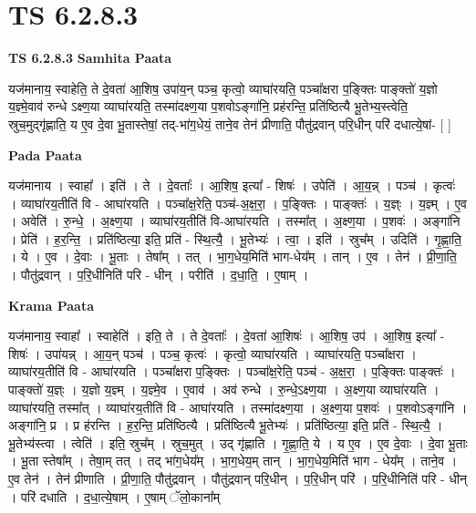 \documentclass[17pt]{extarticle}
\begin{document}
\section{ TS 6.2.8.3 }

\textbf{TS 6.2.8.3 } \newline
\textbf{Samhita Paata} \newline

यज॑मानाय॒ स्वाहेति॒ ते दे॒वता॑ आ॒शिष॒ उपा॑य॒न् पञ्च॒ कृत्वो॒ व्याघा॑रयति॒ पञ्चा᳚क्षरा प॒ङ्क्तिः पाङ्क्तो॑ य॒ज्ञो य॒ज्ञ्मे॒वाव॑ रुन्धे ऽक्ष्ण॒या व्याघा॑रयति॒ तस्मा॑दक्ष्ण॒या प॒शवोऽङ्गा॑नि॒ प्रह॑रन्ति॒ प्रति॑ष्ठित्यै भू॒तेभ्य॒स्त्वेति॒ स्रुच॒मुद्गृ॑ह्णाति॒ य ए॒व दे॒वा भू॒तास्तेषां॒ तद्-भा॑ग॒धेयं॒ ताने॒व तेन॑ प्रीणाति॒ पौतु॑द्रवान् परि॒धीन् परि॑ दधात्ये॒षां- [  ] \newline

\textbf{Pada Paata} \newline

यज॑मानाय । स्वाहा᳚ । इति॑ । ते । दे॒वताः᳚ । आ॒शिष॒ इत्या᳚ - शिषः॑ । उपेति॑ । आ॒य॒न्न् । पञ्च॑ । कृत्वः॑ । व्याघा॑रय॒तीति॑ वि - आघा॑रयति । पञ्चा᳚क्ष॒रेति॒ पञ्च॑-अ॒क्ष॒रा॒ । प॒ङ्क्तिः । पाङ्क्तः॑ । य॒ज्ञ्ः । य॒ज्ञ्म् । ए॒व । अवेति॑ । रु॒न्धे॒ । अ॒क्ष्ण॒या । व्याघा॑रय॒तीति॑ वि-आघा॑रयति । तस्मा᳚त् । अ॒क्ष्ण॒या । प॒शवः॑ । अङ्गा॑नि । प्रेति॑ । ह॒र॒न्ति॒ । प्रति॑ष्ठित्या॒ इति॒ प्रति॑ - स्थि॒त्यै॒ । भू॒तेभ्यः॑ । त्वा॒ । इति॑ । स्रुच᳚म् । उदिति॑ । गृ॒ह्णा॒ति॒ । ये । ए॒व । दे॒वाः । भू॒ताः । तेषा᳚म् । तत् । भा॒ग॒धेय॒मिति॑ भाग-धेय᳚म् । तान् । ए॒व । तेन॑ । प्री॒णा॒ति॒ । पौतु॑द्रवान् । प॒रि॒धीनिति॑ परि - धीन् । परीति॑ । द॒धा॒ति॒ । ए॒षाम् ।  \newline


\textbf{Krama Paata} \newline

यज॑मानाय॒ स्वाहा᳚ । स्वाहेति॑ । इति॒ ते । ते दे॒वताः᳚ । दे॒वता॑ आ॒शिषः॑ । आ॒शिष॒ उप॑ । आ॒शिष॒ इत्या᳚ - शिषः॑ । उपा॑यन्न् । आ॒य॒न् पञ्च॑ । पञ्च॒ कृत्वः॑ । कृत्वो॒ व्याघा॑रयति । व्याघा॑रयति॒ पञ्चा᳚क्षरा । व्याघा॑रय॒तीति॑ वि - आघा॑रयति । पञ्चा᳚क्षरा प॒ङ्‍क्तिः । पञ्चा᳚क्ष॒रेति॒ पञ्च॑ - अ॒क्ष॒रा॒ । प॒ङ्‍क्तिः पाङ्‍क्तः॑ । पाङ्‍क्तो॑ य॒ज्ञ्ः । य॒ज्ञो य॒ज्ञ्म् । य॒ज्ञ्मे॒व । ए॒वाव॑ । अव॑ रुन्धे । रु॒न्धे॒ऽक्ष्ण॒या । अ॒क्ष्ण॒या व्याघा॑रयति । व्याघा॑रयति॒ तस्मा᳚त् । व्याघा॑रय॒तीति॑ वि - आघा॑रयति । तस्मा॑दक्ष्ण॒या । अ॒क्ष्ण॒या प॒शवः॑ । प॒शवोऽङ्‍गा॑नि । अङ्‍गा॑नि॒ प्र । प्र ह॑रन्ति । ह॒र॒न्ति॒ प्रति॑ष्ठित्यै । प्रति॑ष्ठित्यै भू॒तेभ्यः॑ । प्रति॑ष्ठित्या॒ इति॒ प्रति॑ - स्थि॒त्यै॒ । भू॒तेभ्य॑स्त्वा । त्वेति॑ । इति॒ स्रुच᳚म् । स्रुच॒मुत् । उद् गृ॑ह्णाति । गृ॒ह्णा॒ति॒ ये । य ए॒व । ए॒व दे॒वाः । दे॒वा भू॒ताः । भू॒ता स्तेषा᳚म् । तेषा॒म् तत् । तद् भा॑ग॒धेय᳚म् । भा॒ग॒धेय॒म् तान् । भा॒ग॒धेय॒मिति॑ भाग - धेय᳚म् । ताने॒व । ए॒व तेन॑ । तेन॑ प्रीणाति । प्री॒णा॒ति॒ पौतु॑द्रवान् । पौतु॑द्रवान् परि॒धीन् । प॒रि॒धीन् परि॑ । प॒रि॒धीनिति॑ परि - धीन् । परि॑ दधाति । द॒धा॒त्ये॒षाम् । ए॒षाम् ॅलो॒काना᳚म् \newline
\end{document}
